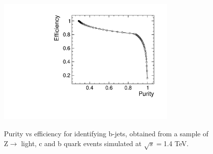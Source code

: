 \begin{figure}[t]
  \centering
  \includegraphics[width=0.78\textwidth,height=7cm,keepaspectratio]{HiggsAnalysis/figures/updatedpurityvsefficiency.pdf}
  \caption[B-Tagging Purity vs Efficiency]{Purity vs efficiency for identifying b-jets, obtained from a sample of Z$\rightarrow$ light, c and b quark events simulated at $\sqrt{s}=$1.4 TeV.}
  \label{fig:Zbtagging}
\end{figure}

